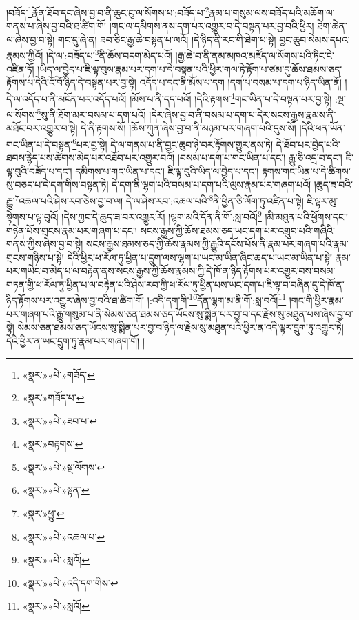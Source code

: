 །བཟོད་\footnote{«སྣར་»«པེ་»གཟོད་}རྣོན་ཐོབ་དང་ཞེས་བྱ་བ་ནི་ཆུང་ངུ་ལ་སོགས་པ་:བཟོད་པ་\footnote{«སྣར་»གཟོད་པ་}རྣམ་པ་གསུམ་ལས་བཟོད་པའི་མཆོག་ལ་གནས་པ་ཞེས་བྱ་བའི་ཐ་ཚིག་གོ། །གང་ལ་དམིགས་ནས་དག་པར་འགྱུར་བ་དེ་བསྟན་པར་བྱ་བའི་ཕྱིར། ཐེག་ཆེན་ལ་ཞེས་བྱ་བ་སྟེ། གང་དུ་ཞེ་ན། ཟབ་ཅིང་རྒྱ་ཆེ་བསྟན་པ་ལའོ། །དེ་ཉིད་ནི་རང་གི་ཐེག་པ་སྟེ། བྱང་ཆུབ་སེམས་དཔའ་རྣམས་ཀྱིའོ། །དེ་ལ་:བཟོད་པ་\footnote{«སྣར་»«པེ་»ཟབ་པ་}ནི་ཆོས་བདག་མེད་པའོ། །རྒྱ་ཆེ་བ་ནི་ནམ་མཁའ་མཛོད་ལ་སོགས་པའི་ཏིང་ངེ་འཛིན་ཏོ། །ཡིད་ལ་བྱེད་པ་ཇི་ལྟ་བུས་རྣམ་པར་དག་པ་དེ་བསྟན་པའི་ཕྱིར་གལ་ཏེ་རྟོག་པ་ཙམ་དུ་ཆོས་ཐམས་ཅད་རྟོགས་པ་དེའི་ངོ་བོ་ཉིད་དེ་བསྟན་པར་བྱ་སྟེ། འདོད་པ་དང་ནི་མོས་པ་དག །དག་པ་བསམ་པ་དག་པ་ཉིད་ཡིན་ནོ། །དེ་ལ་འདོད་པ་ནི་མངོན་པར་འདོད་པའོ། །མོས་པ་ནི་དད་པའོ། །དེའི་རྟགས་\footnote{«སྣར་»བརྟགས་}གང་ཡིན་པ་དེ་བསྟན་པར་བྱ་སྟེ། :སྔ་ལ་སོགས་\footnote{«སྣར་»«པེ་»སྔ་ལོགས་}སུ་ནི་ཐོག་མར་བསམ་པ་དག་པའོ། །དེར་ཞེས་བྱ་བ་ནི་བསམ་པ་དག་པ་དེར་སངས་རྒྱས་རྣམས་ནི་མཐོང་བར་འགྱུར་བ་སྟེ། དེ་ནི་རྟགས་སོ། །ཆོས་ཀུན་ཞེས་བྱ་བ་ནི་མཉམ་པར་གཞག་པའི་དུས་སོ། །དེའི་ཕན་ཡོན་གང་ཡིན་པ་དེ་བསྟན་\footnote{«སྣར་»«པེ་»སྟན་}པར་བྱ་སྟེ། དེ་ལ་གནས་པ་ནི་བྱང་ཆུབ་ཉེ་བར་རྟོགས་གྱུར་ནས་ཏེ། དེ་ཐོབ་པར་བྱེད་པའི་ཐབས་རྙེད་པས་ཚེགས་མེད་པར་འཐོབ་པར་འགྱུར་བའོ། །བསམ་པ་དག་པ་གང་ཡིན་པ་དང་། རྒྱུ་ཅི་འདྲ་བ་དང་། ཇི་ལྟ་བུའི་བཟོད་པ་དང་། དམིགས་པ་གང་ཡིན་པ་དང་། ཇི་ལྟ་བུའི་ཡིད་ལ་བྱེད་པ་དང་། རྟགས་གང་ཡིན་པ་དེ་ཚིགས་སུ་བཅད་པ་དེ་དག་གིས་བསྟན་ཏེ། དེ་དག་ནི་ལྷག་པའི་བསམ་པ་དག་པའི་ལུས་རྣམ་པར་གཞག་པའོ། །ཆུད་ཟ་བའི་རྒྱུ་\footnote{«སྣར་»ཕྱུ་}འཆལ་པའི་ཤེས་རབ་ཅེས་བྱ་བ་ལ། དེ་ལ་ཤེས་རབ་:འཆལ་པའི་\footnote{«སྣར་»«པེ་»འཆལ་པ་}ནི་ཕྱིན་ཅི་ལོག་ཏུ་འཛིན་པ་སྟེ། ཇི་ལྟར་མུ་སྟེགས་པ་ལྟ་བུའོ། །དེས་ཀྱང་དེ་ཆུད་ཟ་བར་འགྱུར་རོ། །ལྷག་མའི་དོན་ནི་གོ་:སླ་བའོ།\footnote{«སྣར་»«པེ་»སླའོ།} །མི་མཐུན་པའི་ཕྱོགས་དང་། གཉེན་པོས་གྲངས་རྣམ་པར་གཞག་པ་དང་། སངས་རྒྱས་ཀྱི་ཆོས་ཐམས་ཅད་ཡང་དག་པར་འགྲུབ་པའི་གཞིའི་གནས་ཀྱིས་ཞེས་བྱ་བ་སྟེ། སངས་རྒྱས་ཐམས་ཅད་ཀྱི་ཆོས་རྣམས་ཀྱི་རྒྱུའི་དངོས་པོས་ནི་རྣམ་པར་གཞག་པའི་རྣམ་གྲངས་གཉིས་པ་སྟེ། དེའི་ཕྱིར་ཕ་རོལ་ཏུ་ཕྱིན་པ་དྲུག་ལས་ལྷག་པ་ཡང་མ་ཡིན་ཞིང་ཆད་པ་ཡང་མ་ཡིན་པ་སྟེ། རྣམ་པར་གཡེང་བ་མེད་པ་ལ་བརྟེན་ནས་སངས་རྒྱས་ཀྱི་ཆོས་རྣམས་ཀྱི་དེ་ཁོ་ན་ཉིད་རྟོགས་པར་འགྱུར་བས་བསམ་གཏན་གྱི་ཕ་རོལ་ཏུ་ཕྱིན་པ་ལ་བརྟེན་པའི་ཤེས་རབ་ཀྱི་ཕ་རོལ་ཏུ་ཕྱིན་པས་ཡང་དག་པ་ཇི་ལྟ་བ་བཞིན་དུ་དེ་ཁོ་ན་ཉིད་རྟོགས་པར་འགྱུར་ཞེས་བྱ་བའི་ཐ་ཚིག་གོ། །:འདི་དག་གི་\footnote{«སྣར་»«པེ་»འདི་དག་གིས་}དོན་ལྷག་མ་ནི་གོ་:སླ་བའོ།\footnote{«སྣར་»«པེ་»སླའོ།} །གང་གི་ཕྱིར་རྣམ་པར་གཞག་པའི་རྒྱུ་གསུམ་པ་ནི་སེམས་ཅན་ཐམས་ཅད་ཡོངས་སུ་སྨིན་པར་བྱ་བ་དང་རྗེས་སུ་མཐུན་པས་ཞེས་བྱ་བ་སྟེ། སེམས་ཅན་ཐམས་ཅད་ཡོངས་སུ་སྨིན་པར་བྱ་བ་ཉིད་ལ་རྗེས་སུ་མཐུན་པའི་ཕྱིར་ན་འདི་ལྟར་དྲུག་ཏུ་འགྱུར་ཏེ། དེའི་ཕྱིར་ན་ཡང་དྲུག་ཏུ་རྣམ་པར་གཞག་གོ། །
